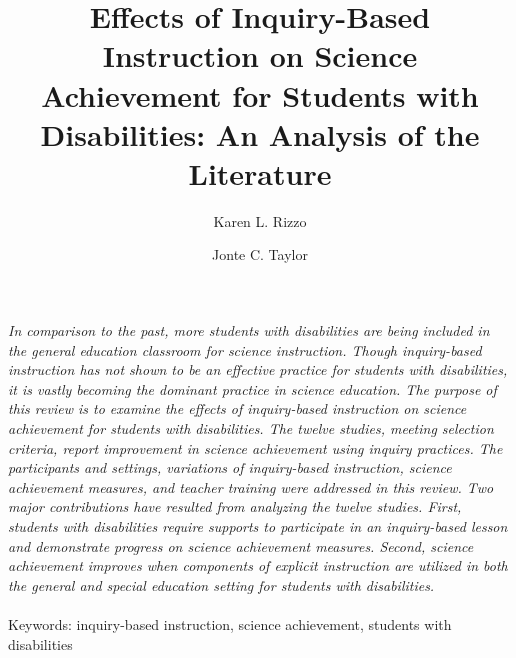 \documentclass[11.5pt]{sig-alternate} %
\makeatletter
\let\oldabstract\abstract
\let\oldendabstract\endabstract
\renewenvironment{abstract} %
{\renewenvironment{quotation}%
               {\list{}{\addtolength{\leftmargin}{1em} %
                        \listparindent 1.5em%
                        \itemindent    \listparindent%
                        \rightmargin   \leftmargin%
                        \parsep        \z@ \@plus\p@}%
                \item\relax}%
               {\endlist}%
\oldabstract}
{\oldendabstract}
\makeatother
\begin{document}
\title{Effects of Inquiry-Based Instruction on Science Achievement for Students with Disabilities:  An Analysis of the Literature}

\author[1]{\large \color{blue}Karen L. Rizzo}
\author[1]{\large \color{blue}Jonte C. Taylor}


\toappear{}
\maketitle
\begin{@twocolumnfalse} 
\begin{abstract}
\item 
\textit{In comparison to the past, more students with disabilities are being included in the general education classroom for science instruction. Though inquiry-based instruction has not shown to be an effective practice for students with disabilities, it is vastly becoming the dominant practice in science education. The purpose of this review is to examine the effects of inquiry-based instruction on science achievement for students with disabilities. The twelve studies, meeting selection criteria, report improvement in science achievement using inquiry practices. The participants and settings, variations of inquiry-based instruction, science achievement measures, and teacher training were addressed in this review. Two major contributions have resulted from analyzing the twelve studies. First, students with disabilities require supports to participate in an inquiry-based lesson and demonstrate progress on science achievement measures. Second, science achievement improves when components of explicit instruction are utilized in both the general and special education setting for students with disabilities.}
\\ \\
Keywords: inquiry-based instruction, science achievement, students with disabilities
\end{abstract}
\end{@twocolumnfalse}

\end{document}
